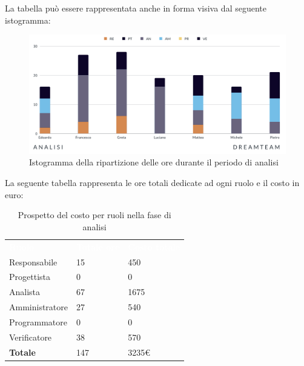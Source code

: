 La tabella può essere rappresentata anche in forma visiva dal seguente istogramma: 
\begin{figure}[H]
\centering
\includegraphics[scale=0.65]{Sezioni/SezioniPreventivo/grafici/Analisi.png}
\caption{Istogramma della ripartizione delle ore durante il periodo di analisi}
\end{figure}

La seguente tabella rappresenta le ore totali dedicate ad ogni ruolo e il costo in euro:

\begin{table}[H]
\begin{center}
\renewcommand{\arraystretch}{1.5}
\begin{tabular}{ m{}<{\centering}  m{}<{\centering} m{}<{\centering}}
	\rowcolor{darkblue}
	\textcolor{white}{\textbf{Ruolo}}&\textcolor{white}{\textbf{Totale ore}}&\textcolor{white}{\textbf{Costo totale}}\\ 

	Responsabile  & 15 &  450\\	
	
	Progettista & 0 &  0 \\
	
	Analista & 67 &  1675\\

	Amministratore & 27 &  540\\
	
	Programmatore & 0 &  0\\
	
	Verificatore & 38 &  570\\
	
	\textbf{Totale} & 147 &  3235\euro \\
	
\end{tabular}
\caption{Prospetto del costo per ruoli nella fase di analisi}
\end{center}
\end{table}

